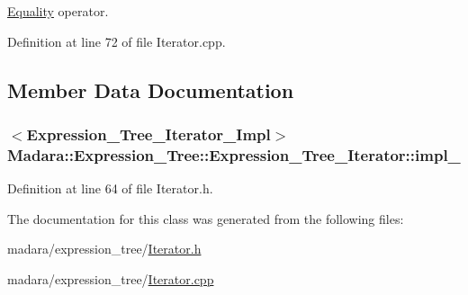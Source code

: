\hyperlink{classMadara_1_1Expression__Tree_1_1Equality}{Equality} operator. 



Definition at line 72 of file Iterator.cpp.



\subsection{Member Data Documentation}
\hypertarget{classMadara_1_1Expression__Tree_1_1Expression__Tree__Iterator_a6d6f041e45f74315fa81515aa64f63b3}{
\subsubsection[{impl\_\-}]{$<${\bf Expression\_\-Tree\_\-Iterator\_\-Impl}$>$ {\bf Madara::Expression\_\-Tree::Expression\_\-Tree\_\-Iterator::impl\_\-}}}
\label{d2/d83/classMadara_1_1Expression__Tree_1_1Expression__Tree__Iterator_a6d6f041e45f74315fa81515aa64f63b3}


Definition at line 64 of file Iterator.h.



The documentation for this class was generated from the following files:\begin{DoxyCompactItemize}
\item 
madara/expression\_\-tree/\hyperlink{Iterator_8h}{Iterator.h}\item 
madara/expression\_\-tree/\hyperlink{Iterator_8cpp}{Iterator.cpp}\end{DoxyCompactItemize}
